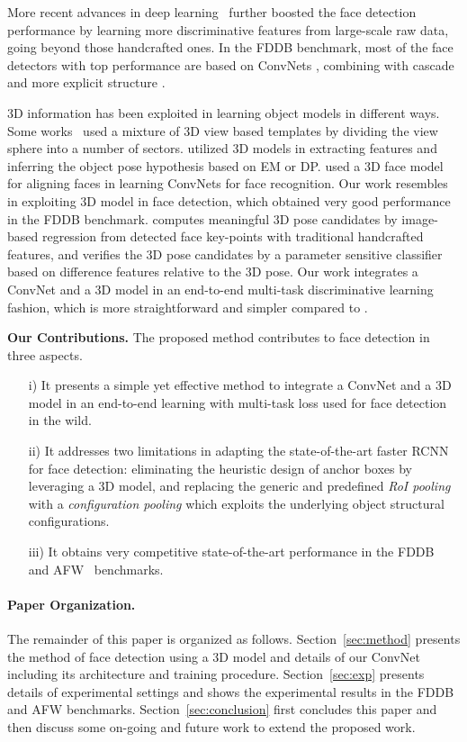 \documentclass[runningheads]{llncs}
\begin{document}
More recent advances in deep learning~\cite{LeCunCNN,AlexNet} further boosted the face detection performance by learning more discriminative features from large-scale raw data, going beyond those handcrafted ones. In the FDDB benchmark, most of the face detectors with top performance are based on ConvNets \cite{DP2MFD,FaceCascadeCNN}, combining with cascade \cite{FaceCascadeCNN} and more explicit structure \cite{FacePart2Whole}.

3D information has been exploited in learning object models in different ways. Some works~\cite{3DViewBased,3DViewBased2} used a mixture of 3D view based templates by dividing the view sphere into a number of sectors. \cite{3DModel,3DTangram} utilized 3D models in extracting features and inferring the object pose hypothesis based on EM or DP. \cite{DeepFace} used a 3D face model for aligning faces in learning ConvNets for face recognition. Our work resembles \cite{Barbu3DFace} in exploiting 3D model in face detection, which obtained very good performance in the FDDB benchmark. \cite{Barbu3DFace} computes meaningful 3D pose candidates by image-based regression from detected face key-points with traditional handcrafted features, and verifies the 3D pose candidates by a parameter sensitive classifier based on difference features relative to the 3D pose. Our work integrates a ConvNet and a 3D model in an end-to-end multi-task discriminative learning fashion, which is more straightforward and simpler compared to \cite{Barbu3DFace}.

{\bf Our Contributions.}  The proposed method contributes to face detection in three aspects.
\begin{enumerate}
\item[i)] It presents a simple yet effective method to integrate a ConvNet and a 3D model in an end-to-end learning with multi-task loss used for face detection in the wild.
\item[ii)] It addresses two limitations in adapting the state-of-the-art faster RCNN~\cite{FasterRCNN} for face detection: eliminating the heuristic design of anchor boxes by leveraging a 3D model, and replacing the generic and predefined {\em RoI pooling} with a {\em configuration pooling} which exploits the underlying object structural configurations.
\item[iii)] It obtains very competitive state-of-the-art performance in the FDDB~\cite{FDDB} and AFW~\cite{AFW} benchmarks.\end{enumerate}

\paragraph{Paper Organization.} The remainder of this paper is organized as follows. Section~\ref{sec:method} presents the method of face detection using a 3D model and details of our ConvNet including its architecture and training procedure. Section~\ref{sec:exp} presents details of experimental settings and shows the experimental results in the FDDB and AFW benchmarks. Section~\ref{sec:conclusion} first concludes this paper and then discuss some on-going and future work to extend the proposed work.
\end{document}
